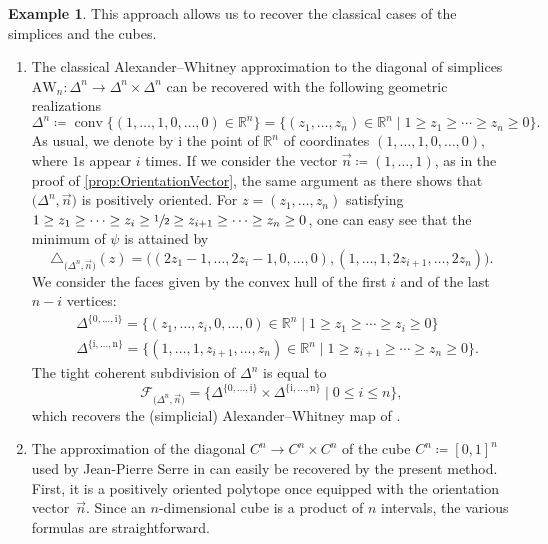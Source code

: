 \documentclass[11pt]{article}
\numberwithin{equation}{section}\providecommand{\No}{}
\let\mathcal\mathscr
\theoremstyle{plain}
\theoremstyle{definition}
\newtheorem{example}{Example}
\newcommand{\RR}{\mathbb{R}}
\newcommand{\sF}{\mathcal{F}}
\DeclareMathOperator{\conv}{conv}
\begin{document}
\begin{example} This approach allows us to recover the classical cases of the simplices and the cubes.
\begin{enumerate}
\item The classical Alexander--Whitney approximation to the diagonal of simplices $\mathrm{AW}_n : \Delta^n \to \Delta^n\times \Delta^n$ can be recovered with the following geometric realizations
\[\Delta^n\coloneqq\conv\big\{(1, \ldots, 1, 0,\ldots, 0)\in \RR^n\big\}=
\big\{(z_1, \ldots, z_n)\in \RR^n\mid
1 \geq z_1\geq \cdots \geq z_n \geq 0
\big\}.
\]
As usual, we denote by $\mathrm{i}$ the point of $\RR^n$ of coordinates $(1, \ldots, 1, 0,\ldots, 0)$,
where $1$s appear $i$ times. If we consider the vector $\vec n\coloneqq (1, \ldots, 1)$, as in the proof of \cref{prop:OrientationVector}, the same argument as there shows that $\big(\Delta^n, \vec n \big)$ is
positively oriented.
For $z=(z_1, \ldots, z_n)$ satisfying
$1 \geq z_1\geq \cdots \geq z_i \geq \sfrac{1}{2} \geq z_{i+1}\geq \cdots \geq z_n \geq 0$,
one can easy see that the minimum of $\psi$ is attained by
\[
\triangle_{\big(\Delta^n, \vec n\big)}(z)=
\big((
2z_1-1, \ldots, 2z_i-1, 0, \ldots, 0),
(
1, \ldots, 1,
2z_{i+1}, \ldots, 2z_n
)\big).
\]
We consider the faces given by the convex hull of the first $i$ and of the last $n-i$ vertices:
\begin{align*}
&\Delta^{\{\mathrm{0}, \ldots, \mathrm{i} \}}=
\big\{(z_1, \ldots, z_i, 0, \ldots, 0)\in \RR^n\mid
1 \geq z_1\geq \cdots \geq z_i \geq 0
\big\}\\
\tag*{and}&
\Delta^{\{\mathrm{i}, \ldots, \mathrm{n} \}}=
\big\{(1, \ldots, 1, z_{i+1}, \ldots, z_n)\in \RR^n\mid
1 \geq z_{i+1}\geq \cdots \geq z_n \geq 0
\big\}.
\end{align*}
The tight coherent subdivision of $\Delta^n$ is
equal to
\[\sF_{\big(\Delta^n, \vec n\big)}=
\bigl\{\Delta^{\{\mathrm{0}, \ldots, \mathrm{i} \}} \times \Delta^{\{\mathrm{i}, \ldots, \mathrm{n} \}} \mid
0 \leq i \leq n
\bigr\},
\]
which recovers the (simplicial) Alexander--Whitney map of \cite{EilenbergZilber53, EilenbergMacLane54}.

\item The approximation of the diagonal $C^n \to C^n\times C^n$ of the cube $C^n\coloneqq [0,1]^n$ used by Jean-Pierre Serre in \cite{Serre51} can easily be recovered by the present method. First, it is a positively oriented polytope once equipped with the orientation vector~$\vec n$. Since an $n$-dimensional cube is a product of $n$ intervals, the various formulas are straightforward.
\end{enumerate}
\end{example}
\end{document}
